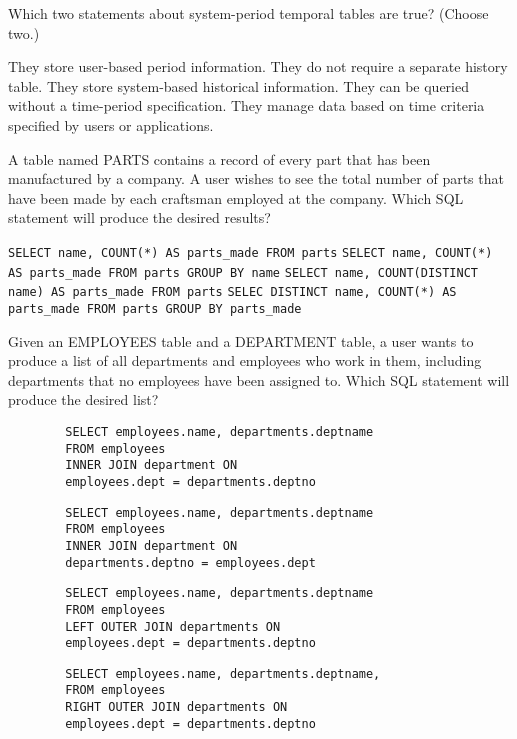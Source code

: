 \documentclass[11pt]{exam}
\begin{document}
\begin{questions}
\question[1]
Which two statements about system-period temporal tables are true? (Choose two.)
\begin{choices}
\choice They store user-based period information.
\choice They do not require a separate history table.
\choice They store system-based historical information.
\choice They can be queried without a time-period specification.
\choice They manage data based on time criteria specified by users or applications.
\end{choices} 

\question[1]
A table named PARTS contains a record of every part that has been manufactured by a company. A user
wishes to see the total number of parts that have been made by each craftsman employed at the company.
Which SQL statement will produce the desired results?
\begin{choices}
\choice \texttt{SELECT name, COUNT(*) AS parts\_made FROM parts}
\choice \texttt{SELECT name, COUNT(*) AS parts\_made FROM parts GROUP BY name}
\choice \texttt{SELECT name, COUNT(DISTINCT name) AS parts\_made FROM parts}
\choice \texttt{SELEC DISTINCT name, COUNT(*) AS parts\_made FROM parts GROUP BY parts\_made}
\end{choices}

\newpage
\question[1]
Given an EMPLOYEES table and a DEPARTMENT table, a user wants to produce a list of all departments and
employees who work in them, including departments that no employees have been assigned to. Which SQL
statement will produce the desired list?
\begin{choices}
\choice \begin{verbatim}
		SELECT employees.name, departments.deptname
		FROM employees
		INNER JOIN department ON
		employees.dept = departments.deptno
		\end{verbatim} 
\choice	\begin{verbatim}
		SELECT employees.name, departments.deptname
		FROM employees
		INNER JOIN department ON
		departments.deptno = employees.dept
		\end{verbatim}
\choice \begin{verbatim}
		SELECT employees.name, departments.deptname
		FROM employees
		LEFT OUTER JOIN departments ON
		employees.dept = departments.deptno
		\end{verbatim}
\choice \begin{verbatim}
		SELECT employees.name, departments.deptname,
		FROM employees
		RIGHT OUTER JOIN departments ON
		employees.dept = departments.deptno
		\end{verbatim}
\end{choices}


\end{questions}
\end{document}
